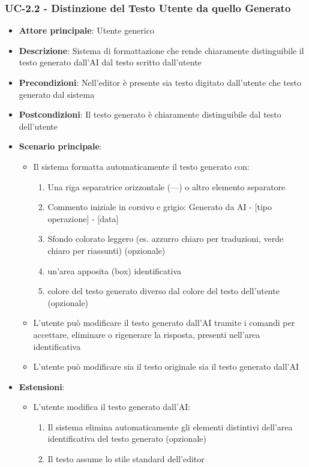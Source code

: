 \documentclass[11pt,a4paper]{article}
\begin{document}
\subsubsection{UC-2.2 - Distinzione del Testo Utente da quello Generato}
\begin{itemize}
    \item \textbf{Attore principale}: Utente generico
    \item \textbf{Descrizione}: Sistema di formattazione che rende chiaramente distinguibile il testo generato dall'AI dal testo scritto dall'utente
    \item \textbf{Precondizioni}: Nell'editor è presente sia testo digitato dall'utente che testo generato dal sistema
    \item \textbf{Postcondizioni}: Il testo generato è chiaramente distinguibile dal testo dell'utente
    \item \textbf{Scenario principale}:
        \begin{itemize}
            \item Il sistema formatta automaticamente il testo generato con:
                \begin{enumerate}
                    \item Una riga separatrice orizzontale (---) o altro elemento separatore
                    \item Commento iniziale in corsivo e grigio: Generato da AI - [tipo operazione] - [data]
                    \item Sfondo colorato leggero (es. azzurro chiaro per traduzioni, verde chiaro per riassunti) (opzionale)
                    \item un’area apposita (box) identificativa
                    \item colore del testo generato diverso dal colore del testo dell’utente (opzionale)
                \end{enumerate}
            \item L'utente può modificare il testo generato dall’AI tramite i comandi per accettare, eliminare o rigenerare la risposta, presenti nell’area identificativa
            \item L’utente può modificare sia il testo originale sia il testo generato dall’AI
        \end{itemize}
    \item \textbf{Estensioni}:
        \begin{itemize}
            \item L'utente modifica il testo generato dall'AI:
                \begin{enumerate}
                    \item Il sistema elimina automaticamente gli elementi distintivi dell’area identificativa del testo generato (opzionale)
                    \item Il testo assume lo stile standard dell’editor
                \end{enumerate}
        \end{itemize}
\end{itemize}
\end{document}
